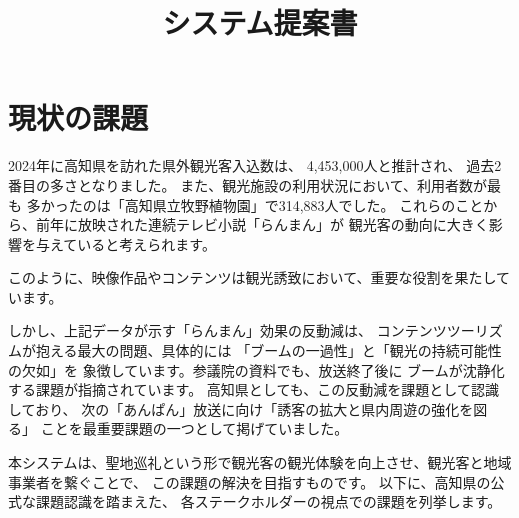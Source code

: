 \documentclass{docs}
\title{システム提案書}
\begin{document}
\section{現状の課題}\label{sec:issues}
2024年に高知県を訪れた県外観光客入込数は、%
4,453,000人と推計され、%
過去2番目の多さとなりました。
また、観光施設の利用状況において、利用者数が最も
多かったのは「高知県立牧野植物園」で314,883人でした\cite{kochi_tourism_stat}。
これらのことから、前年に放映された連続テレビ小説「らんまん」が
観光客の動向に大きく影響を与えていると考えられます。

このように、映像作品やコンテンツは観光誘致において、重要な役割を果たしています。

しかし、上記データが示す「らんまん」効果の反動減は、
コンテンツツーリズムが抱える最大の問題、具体的には
「ブームの一過性」と「観光の持続可能性の欠如」を
象徴しています。参議院の資料\cite{sangiin2012}でも、放送終了後に
ブームが沈静化する課題が指摘されています。
高知県としても、この反動減を課題として認識しており、
次の「あんぱん」放送に向け「誘客の拡大と県内周遊の強化を図る」
ことを最重要課題の一つとして掲げていました\cite{kochi_r7_plan}。

本システムは、聖地巡礼という形で観光客の観光体験を向上させ、観光客と地域事業者を繋ぐことで、
この課題の解決を目指すものです。
以下に、高知県の公式な課題認識\cite{kochi_dx_plan}を踏まえた、
各ステークホルダーの視点での課題を列挙します。
\end{document}
